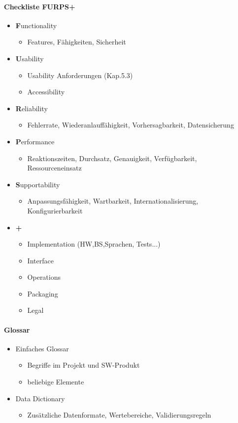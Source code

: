 \documentclass[../ZF_SWEN1.tex]{subfiles}
\begin{document}
\paragraph{Checkliste FURPS+}

\begin{itemize}
	\item \textbf Functionality
	\begin{itemize}
		\item Features, Fähigkeiten, Sicherheit
	\end{itemize}
	\item \textbf Usability
	\begin{itemize}
		\item Usability Anforderungen (Kap.5.3)
		\item Accessibility
	\end{itemize}
	\item \textbf Reliability
	\begin{itemize}
		\item Fehlerrate, Wiederanlauffähigkeit, Vorhersagbarkeit, Datensicherung
	\end{itemize}
	\item \textbf Performance
	\begin{itemize}
		\item Reaktionszeiten, Durchsatz, Genauigkeit, Verfügbarkeit, Ressourceneinsatz
	\end{itemize}
	\item \textbf Supportability
	\begin{itemize}
		\item Anpassungsfähigkeit, Wartbarkeit, Internationalisierung, Konfigurierbarkeit
	\end{itemize}
	\item \textbf {+}
	\begin{itemize}
		\item Implementation (HW,BS,Sprachen, Tests...)
		\item Interface
		\item Operations
		\item Packaging
		\item Legal
	\end{itemize}
\end{itemize}


\paragraph{Glossar}

\begin{itemize}
	\item Einfaches Glossar
	\begin{itemize}
		\item Begriffe im Projekt und SW-Produkt
		\item beliebige Elemente 
	\end{itemize}
	\item Data Dictionary
	\begin{itemize}
		\item Zusätzliche Datenformate, Wertebereiche, Validierungsregeln
	\end{itemize}
\end{itemize}
\end{document}
